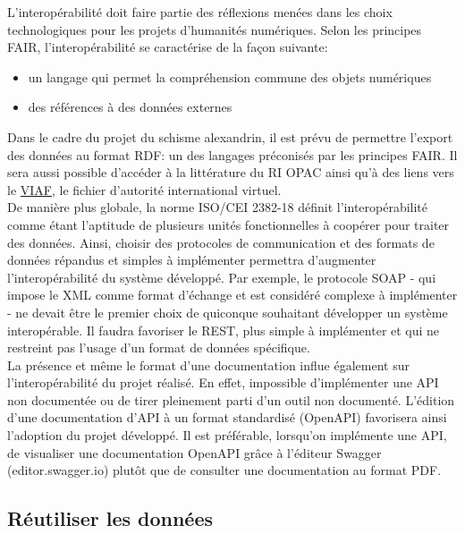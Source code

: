 L’interopérabilité doit faire partie des réflexions menées dans les choix technologiques pour les projets d’humanités numériques. Selon les principes FAIR, l’interopérabilité se caractérise de la façon suivante:\\
\begin{itemize} 
\item un langage qui permet la compréhension commune des objets numériques
\item des références à des données externes\\
\end{itemize}
Dans le cadre du projet du schisme alexandrin, il est prévu de permettre l’export des données au format RDF: un des langages préconisés par les principes FAIR. 
Il sera aussi possible d’accéder à la littérature du RI OPAC ainsi qu’à des liens vers le \href{https://viaf.org/}{VIAF}, le fichier d’autorité international virtuel.\\
De manière plus globale, la norme ISO/CEI 2382-18 définit l’interopérabilité comme étant l’aptitude de plusieurs unités fonctionnelles à coopérer pour traiter des données. Ainsi, choisir des protocoles de communication et des formats de données répandus et simples à implémenter permettra d’augmenter l’interopérabilité du système développé. Par exemple, le protocole SOAP - qui impose le XML comme format d’échange et est considéré complexe à implémenter - ne devait être le premier choix de quiconque souhaitant développer un système interopérable. Il faudra favoriser le REST, plus simple à implémenter et qui ne restreint pas l’usage d’un format de données spécifique.\\
La présence et même le format d’une documentation influe également sur l’interopérabilité du projet réalisé. En effet, impossible d’implémenter une API non documentée ou de tirer pleinement parti d’un outil non documenté. L’édition d’une documentation d’API à un format standardisé (OpenAPI) favorisera ainsi l’adoption du projet développé. Il est préférable, lorsqu’on implémente une API, de visualiser une documentation OpenAPI grâce à l’éditeur Swagger (editor.swagger.io) plutôt que de consulter une documentation au format PDF.

    \subsection{Réutiliser les données}

